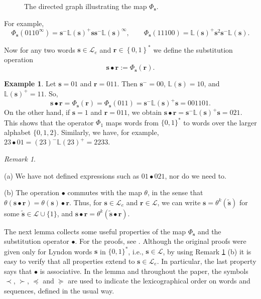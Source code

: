 \documentclass[12pt]{amsart}
\theoremstyle{definition}
\newtheorem{example}[theorem]{Example}
\theoremstyle{remark}
\newtheorem{remark}[theorem]{Remark}
\numberwithin{equation}{section}
\renewcommand{\L}{\ensuremath{\mathbb{L}}}
\newcommand{\LL}{\Omega_{L}^*}
\newcommand{\cL}{\mathcal{L}}
\newcommand{\s}{ {\mathbf{s}}}
\renewcommand{\r}{ {\mathbf{r}}}
\newcommand{\set}[1]{\left\{#1\right\}}
\newcommand{\f}{\infty}
\newcommand{\lle}{\preccurlyeq}
\newcommand{\lge}{\succcurlyeq}
\begin{document}
{\begin{figure}[h!]
\caption{The directed graph illustrating the map $\Phi_\s$.}
\label{fig:directed-graph}
\end{figure}
For example,
\[
\Phi_\s(0110^\f)=\s^-\L(\s)^+\s\s^-\L(\s)^\f, \qquad \Phi_\s(11100)=\L(\s)^+\s^2\s^-\L(\s).
\]

Now for any two words $\s\in\cL_e$ and $\r\in\set{0,1}^*$ we define the substitution operation
\begin{equation} \label{eq:substitution}
\s\bullet\r:=\Phi_\s(\r).
\end{equation}

\begin{example} \label{ex:1}
Let $\s=01$ and $\r=011$. Then $\s^-=00$, $\L(\s)=10$, and $\L(\s)^+=11$. So,
\[
\s\bullet\r=\Phi_\s(\r)=\Phi_\s(011)={\s^-}\L(\s)^+\s=001101.
\]
On the other hand, if $\s=1$ and $\r=011$, we obtain $\s\bullet\r={\s^-}\L(\s)^+\s=021$. This shows that the operator $\Phi_1$ maps words from $\{0,1\}^*$ to words over the larger alphabet $\{0,1,2\}$. Similarly, we have, for example, $23\bullet 01=(23)^-\L(23)^+=2233$.
\end{example}

\begin{remark} \label{rem:substitution-remarks}
{\rm
(a) We have not defined expressions such as $01\bullet 021$, nor do we need to.

(b) The operation $\bullet$ commutes with the map $\theta$, in the sense that $\theta(\s\bullet\r)=\theta(\s)\bullet\r$. Thus, for $\s\in\cL_e$ and $\r\in\cL$, we can write $\s=\theta^k(\tilde{\s})$ for some $\tilde{\s}\in\cL\cup\{1\}$, and
$\s\bullet\r=\theta^k(\tilde{\s}\bullet\r)$.
}
\end{remark}

The next lemma collects some useful properties of the map $\Phi_\s$ and the substitution operator $\bullet$. For the proofs, see \cite[Section 3]{Allaart-Kong-2021}. Although the original proofs were given only for Lyndon words $\s$ in $\{0,1\}^*$, i.e., $\s\in\cL$, by using Remark \ref{rem:substitution-remarks} (b) it is easy to verify that all properties extend to $\s\in \cL_e$. In particular, the last property says that $\bullet$ is associative. In the lemma and throughout the paper, the symbols $\prec$, $\succ$, $\lle$ and $\lge$ are used to indicate the lexicographical order on words and sequences, defined in the usual way.

}
\end{document}
